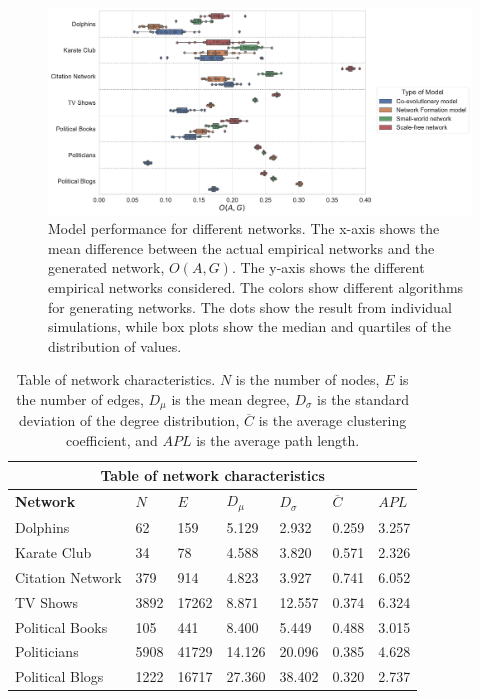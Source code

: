 \documentclass[11pt]{article}
\begin{document}
\begin{figure}[H]
    \centering
    \includegraphics[width=.9\linewidth]{../plots/overall/Model_Evaluation.pdf}
  \caption{Model performance for different networks. The x-axis shows the mean difference between the actual empirical networks and the generated network, $O(A, G)$. The y-axis shows the different empirical networks considered. The colors show different algorithms for generating networks. The dots show the result from individual simulations, while box plots show the median and quartiles of the distribution of values.}
  \label{fig:eval_mean}
\end{figure}

\begin{table}[H]
    \begin{center}
        
    \begin{tabular}{ |p{3cm}||p{1.6cm}|p{1.6cm}|p{1.6cm}|p{1.6cm}|p{1.6cm}|p{1.6cm}|}
        \hline
        \multicolumn{7}{|c|}{Table of network characteristics} \\
        \hline
        \bf{Network} & $N$ & $E$ & $D_{\mu}$ & $D_{\sigma}$ & $\overline{C}$ & $APL$\\
        \hline
        Dolphins   & 62    &159&   5.129&   2.932 &   0.259 & 3.257\\
        Karate Club &34	&78	&4.588&	3.820&	0.571&	2.326\\
        Citation Network & 379 &	914	& 4.823	& 3.927 & 0.741 & 6.052 \\
        TV Shows & 3892 & 17262&8.871 & 12.557 & 0.374&6.324\\
        Political Books &105 &	441	& 8.400 &	5.449 &	0.488 &	3.015\\
        Politicians&  5908 &41729 & 14.126 & 20.096 &	0.385 & 4.628\\
        Political Blogs &	1222 & 16717 & 27.360 & 38.402 & 0.320 & 2.737\\
        \hline
    \end{tabular}
    \end{center}
    \caption{Table of network characteristics. $N$ is the number of nodes, $E$ is the number of edges, $D_{\mu}$ is the mean degree, $D_{\sigma}$ is the standard deviation of the degree distribution, $\overline{C}$ is the average clustering coefficient, and $APL$ is the average path length. }
    \label{table:characteristics}
    \end{table}
\end{document}
